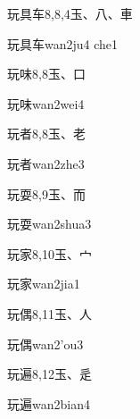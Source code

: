 \begin{entry}{玩具车}{8,8,4}{⽟、⼋、⾞}
  \begin{phonetics}{玩具车}{wan2ju4 che1}
  \end{phonetics}
\end{entry}

\begin{entry}{玩味}{8,8}{⽟、⼝}
  \begin{phonetics}{玩味}{wan2wei4}
  \end{phonetics}
\end{entry}

\begin{entry}{玩者}{8,8}{⽟、⽼}
  \begin{phonetics}{玩者}{wan2zhe3}
  \end{phonetics}
\end{entry}

\begin{entry}{玩耍}{8,9}{⽟、⽽}
  \begin{phonetics}{玩耍}{wan2shua3}
  \end{phonetics}
\end{entry}

\begin{entry}{玩家}{8,10}{⽟、⼧}
  \begin{phonetics}{玩家}{wan2jia1}
  \end{phonetics}
\end{entry}

\begin{entry}{玩偶}{8,11}{⽟、⼈}
  \begin{phonetics}{玩偶}{wan2'ou3}
  \end{phonetics}
\end{entry}

\begin{entry}{玩遍}{8,12}{⽟、⾡}
  \begin{phonetics}{玩遍}{wan2bian4}
  \end{phonetics}
\end{entry}

